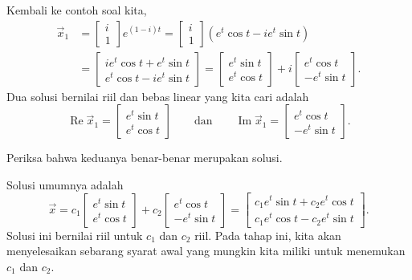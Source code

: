 Kembali ke contoh soal kita,
\begin{equation*}
\begin{split}
\vec{x}_1 & =
\begin{bmatrix} i \\ 1 \end{bmatrix} e^{(1-i)t}
=
\begin{bmatrix} i \\ 1 \end{bmatrix} \left( e^t \cos t - i e^t \sin t \right)
\\
& =
\begin{bmatrix}
i e^t \cos t + e^t \sin t  \\
e^t \cos t - i e^t \sin t
\end{bmatrix}
=
\begin{bmatrix}
e^t \sin t  \\
e^t \cos t
\end{bmatrix}
+ i
\begin{bmatrix}
e^t \cos t  \\
- e^t \sin t
\end{bmatrix}
.
\end{split}
\end{equation*}
Dua solusi bernilai riil dan bebas linear yang kita cari adalah
\begin{equation*}
\operatorname{Re} \vec{x}_1 = 
\begin{bmatrix}
e^t \sin t  \\
e^t \cos t
\end{bmatrix}
\qquad \text{dan} \qquad
\operatorname{Im} \vec{x}_1 = 
\begin{bmatrix}
e^t \cos t \\
- e^t \sin t
\end{bmatrix}
.
\end{equation*}

\begin{exercise}
Periksa bahwa keduanya benar-benar merupakan solusi.
\end{exercise}

Solusi umumnya adalah
\begin{equation*}
\vec{x}
=
c_1
\begin{bmatrix}
e^t \sin t  \\
e^t \cos t
\end{bmatrix} 
+ c_2
\begin{bmatrix}
e^t \cos t \\
-e^t \sin t
\end{bmatrix} 
=
\begin{bmatrix}
c_1 e^t \sin t + c_2 e^t \cos t \\
c_1 e^t \cos t - c_2 e^t \sin t
\end{bmatrix} .
\end{equation*}
Solusi ini bernilai riil untuk $c_1$ dan $c_2$ riil.  Pada tahap ini, kita akan menyelesaikan
sebarang syarat awal yang mungkin kita miliki untuk menemukan $c_1$ dan $c_2$.


